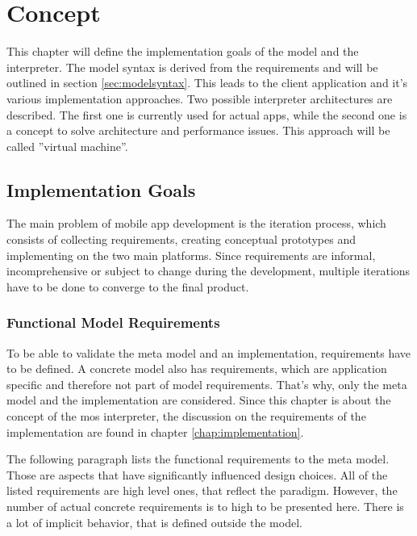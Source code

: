 
\chapter{Concept}
\label{chap:concept}

This chapter will define the implementation goals of the model and the interpreter.
The model syntax is derived from the requirements and will be outlined in section \ref{sec:modelsyntax}.
This leads to the client application and it's various implementation approaches.
Two possible interpreter architectures are described.
The first one is currently used for actual apps, while the second one is a concept to solve architecture and performance issues.
This approach will be called ''virtual machine''.

\section{Implementation Goals}
\label{sec:implementationgloas}

The main problem of mobile app development is the iteration process, which consists of collecting requirements, creating conceptual prototypes and implementing on the two main platforms.
Since requirements are informal, incomprehensive or subject to change during the development, multiple iterations have to be done to converge to the final product.

\subsection{Functional Model Requirements}
\label{functionalmodelrequirements}

To be able to validate the meta model and an implementation, requirements have to be defined.
A concrete model also has requirements, which are application specific and therefore not part of model requirements.
That's why, only the meta model and the implementation are considered.
Since this chapter is about the concept of the \ac{mos} interpreter, the discussion on the requirements of the implementation are found in chapter \ref{chap:implementation}.

The following paragraph lists the functional requirements to the meta model.
Those are aspects that have significantly influenced design choices.
All of the listed requirements are high level ones, that reflect the paradigm.
However, the number of actual concrete requirements is to high to be presented here.
There is a lot of implicit behavior, that is defined outside the model.


